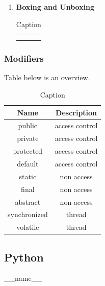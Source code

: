 \documentclass[12pt, a4paper]{report}
\begin{document}
\begin{enumerate}
            \item \textbf{Boxing and Unboxing}
            \begin{table}[H]
                \centering
                \begin{tabular}{c|c}
                     &  \\
                     & 
                \end{tabular}
                \caption{Caption}
                \label{tab:my_label}
            \end{table}
        \end{enumerate}
        
        \subsubsection{Modifiers}
        Table below is an overview. 
        \begin{table}[H]
            \centering
            \begin{tabular}{c|c}
                \toprule
                Name & Description \\
                \hline
                public & access control \\
                \hline
                private & access control \\
                \hline
                protected & access control \\
                \hline
                default & access control \\
                \hline
                static & non access \\
                \hline
                final & non access \\
                \hline
                abstract & non access \\
                \hline
                synchronized & thread \\
                \hline
                volatile & thread \\
                \bottomrule
            \end{tabular}
            \caption{Caption}
            \label{tab:my_label}
        \end{table}

    \subsection{Python}
    \_\_name\_\_
    
\end{document}

